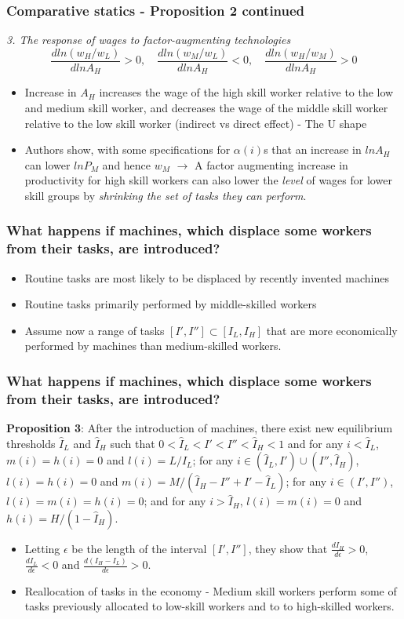 \documentclass[mathserif]{beamer}
\begin{document}
\begin{frame}
\frametitle{Comparative statics - \textbf{Proposition 2} continued}
\textit{3. The response of wages to factor-augmenting technologies}
\begin{equation*}
\frac{dln(w_H/w_L)}{dlnA_H}>0, \quad \frac{dln(w_M/w_L)}{dlnA_H}<0, \quad \frac{dln(w_H/w_M)}{dlnA_H}>0
\end{equation*}
\begin{itemize}
\item Increase in $A_H$ increases the wage of the high skill worker relative to the low and medium skill worker, and decreases the wage of the middle skill worker relative to the low skill worker (indirect vs direct effect) - The U shape
\item Authors show, with some specifications for $\alpha(i)$s that an increase in $lnA_H$ can lower $lnP_M$ and hence $w_M$ $\rightarrow$ A factor augmenting increase in productivity for high skill workers can also lower the \textit{level} of wages for lower skill groups by \textit{shrinking the set of tasks they can perform}.
\end{itemize}
\end{frame}
\begin{frame}
\frametitle{What happens if machines, which displace some workers from their tasks, are introduced?}
\begin{itemize}
\item  Routine tasks are most likely to be displaced by recently invented machines
\item Routine tasks primarily performed by middle-skilled workers
\item Assume now a range of tasks $[I',I'']\subset [I_L,I_H]$ that are more economically performed by machines than medium-skilled workers.
\end{itemize}
\end{frame}
\begin{frame}
\frametitle{What happens if machines, which displace some workers from their tasks, are introduced?}
\textbf{Proposition 3}: After the introduction of machines, there exist new equilibrium thresholds $\hat{I}_L$ and $\hat{I}_H$ such that $0<\hat{I}_L<I'<I''<\hat{I}_H<1$ and for any $i<\hat{I}_L$, $m(i)=h(i)=0$ and $l(i)=L/\hat{I}_L$; for any $i\in (\hat{I}_L,I')\cup(I'',\hat{I}_H)$, $l(i)=h(i)=0$ and $m(i)=M/(\hat{I}_H-I''+I'-\hat{I}_L)$; for any $i\in(I',I'')$, $l(i)=m(i)=h(i)=0$; and for any $i>\hat{I}_H$, $l(i)=m(i)=0$ and $h(i)=H/(1-\hat{I}_H)$.
\begin{itemize}
\item Letting $\epsilon$ be the length of the interval $[I',I'']$, they show that $\frac{dI_H}{d\epsilon}>0$, $\frac{dI_L}{d\epsilon}<0$ and $\frac{d(I_H-I_L)}{d\epsilon}>0$.
\item Reallocation of tasks in the economy - Medium skill workers perform some of tasks previously allocated to low-skill workers and to to high-skilled workers.
\end{itemize}
\end{frame}
\end{document}
